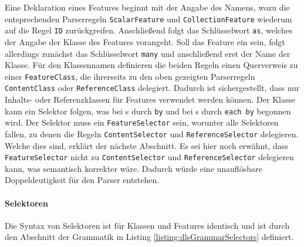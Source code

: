     Eine Deklaration eines Features beginnt mit der Angabe des Namens,
    wozu die entsprechenden Parserregeln \texttt{ScalarFeature} und \texttt{CollectionFeature}
    wiederum auf die Regel \texttt{ID} zurückgreifen.    
    Anschließend folgt das Schlüsselwort \texttt{as}, welches der Angabe der Klasse
    des Features vorangeht.
    Soll das Feature ein {\collectionFeature} sein, folgt allerdings zunächst das
    Schlüsselwort \texttt{many} und anschließend erst der Name der Klasse.
    Für den Klassennamen definieren die beiden Regeln einen Querverweis zu einer \texttt{FeatureClass},
    die ihrerseits zu den oben gezeigten Parserregeln \texttt{ContentClass} oder
    \texttt{ReferenceClass} delegiert.
    Dadurch ist sichergestellt, dass nur Inhalts- oder Referenzklassen für Features verwendet werden können.
    Der Klasse kann ein Selektor folgen,
    was bei {\scalarFeature}s durch \texttt{by} und bei
    {\collectionFeature}s durch \texttt{each by} begonnen wird.
    Der Selektor muss ein \texttt{FeatureSelector} sein,
    worunter alle Selektoren fallen, zu denen die Regeln \texttt{ContentSelector}
    und \texttt{ReferenceSelector} delegieren.
    Welche dies sind, erklärt der nächste Abschnitt.
    Es sei hier noch erwähnt, dass \texttt{FeatureSelector} nicht zu
    \texttt{ContentSelector} und \texttt{ReferenceSelector} delegieren kann,
    was semantisch korrekter wäre.
    Dadurch würde eine unauflösbare Doppeldeutigkeit für den Parser entstehen.

    \paragraph{Selektoren}
    Die Syntax von Selektoren ist für Klassen und Features identisch
    und ist durch den Abschnitt der Grammatik in Listing \ref{listing:dlsGrammarSelectors} definiert.

    

